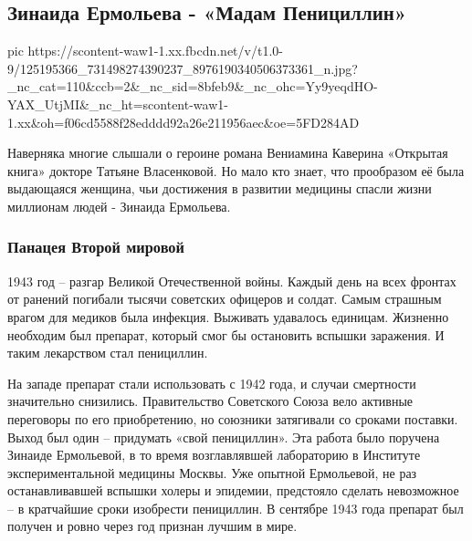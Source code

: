  
 
 

\subsection{Зинаида Ермольева - «Мадам Пенициллин»}


\ifcmt
pic https://scontent-waw1-1.xx.fbcdn.net/v/t1.0-9/125195366_731498274390237_8976190340506373361_n.jpg?_nc_cat=110&ccb=2&_nc_sid=8bfeb9&_nc_ohc=Yy9yeqdHO-YAX_UtjMI&_nc_ht=scontent-waw1-1.xx&oh=f06cd5588f28edddd92a26e211956aec&oe=5FD284AD
\fi

Наверняка многие слышали о героине романа Вениамина Каверина «Открытая книга»
докторе Татьяне Власенковой. Но мало кто знает, что прообразом её была
выдающаяся женщина, чьи достижения в развитии медицины спасли жизни миллионам
людей - Зинаида Ермольева.

\subsubsection{Панацея Второй мировой}

1943 год – разгар Великой Отечественной войны. Каждый день на всех фронтах от
ранений погибали тысячи советских офицеров и солдат. Самым страшным врагом для
медиков была инфекция. Выживать удавалось единицам. Жизненно необходим был
препарат, который смог бы остановить вспышки заражения. И таким лекарством стал
пенициллин.

На западе препарат стали использовать с 1942 года, и случаи смертности
значительно снизились. Правительство Советского Союза вело активные переговоры
по его приобретению, но союзники затягивали со сроками поставки. Выход был один
– придумать «свой пенициллин». Эта работа было поручена Зинаиде Ермольевой, в
то время возглавлявшей лабораторию в Институте экспериментальной медицины
Москвы. Уже опытной Ермольевой, не раз останавливавшей вспышки холеры и
эпидемии, предстояло сделать невозможное – в кратчайшие сроки изобрести
пенициллин. В сентябре 1943 года препарат был получен и ровно через год признан
лучшим в мире.

